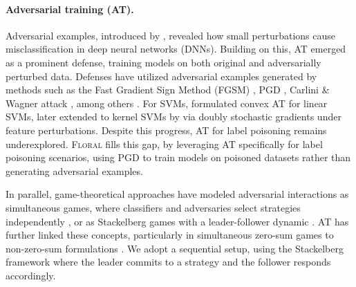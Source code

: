 \paragraph{Adversarial training (AT).} 
Adversarial examples, introduced by \citet{szegedy2013intriguing}, revealed how small perturbations cause misclassification in deep neural networks (DNNs).
Building on this, AT \citep{goodfellow-2014} emerged as a prominent defense, training models on both original and adversarially perturbed data.
Defenses have utilized adversarial examples generated by methods such as the Fast Gradient Sign Method (FGSM) \citep{goodfellow-2014}, PGD \citep{madry2017towards}, Carlini \& Wagner attack \citep{carlini2017towards}, among others \citep{chen2017zoo, moosavi2016deepfool}.
For SVMs, \citet{zhou2012adversarial} formulated convex AT for linear SVMs, later extended to kernel SVMs by \citet{fast-scalable-adv-svm} via doubly stochastic gradients under feature perturbations.
Despite this progress, AT for label poisoning remains underexplored.
\textsc{Floral} fills this gap, by leveraging AT specifically for label poisoning scenarios, using PGD to train models on poisoned datasets rather than generating adversarial examples.

In parallel, game-theoretical approaches have modeled adversarial interactions 
as simultaneous games, where classifiers and adversaries select strategies independently
\citep{adversarial-classification}, or as Stackelberg games with a leader-follower dynamic \citep{bruckner2011stackelberg, zhou2019survey, chivukula2020game}. 
AT has further linked these concepts, particularly in simultaneous zero-sum games \citep{hsieh2019finding, pinot2020randomization, pal2020game} to non-zero-sum formulations \citep{at-nonzero-game}.
We adopt a sequential setup, using the Stackelberg framework where the leader commits to a strategy and the follower responds accordingly.
